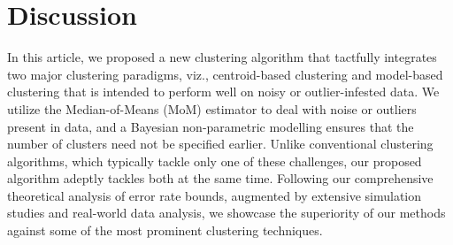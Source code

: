 \documentclass[12pt]{article}
\begin{document}

\section{Discussion}

In this article, we proposed a new clustering algorithm that tactfully integrates two major clustering paradigms, viz., centroid-based clustering and model-based clustering that is intended to perform  well on noisy or outlier-infested data. We utilize the Median-of-Means (MoM) estimator to deal with noise or outliers present in data, and a Bayesian non-parametric modelling ensures that the number of clusters need not be specified earlier. Unlike conventional clustering algorithms, which typically tackle only one of these challenges, our proposed algorithm adeptly tackles both at the same time. Following our comprehensive theoretical analysis of error rate bounds, augmented by extensive simulation studies and real-world data analysis, we showcase the superiority of our methods against some of the most prominent clustering techniques.
\end{document}
